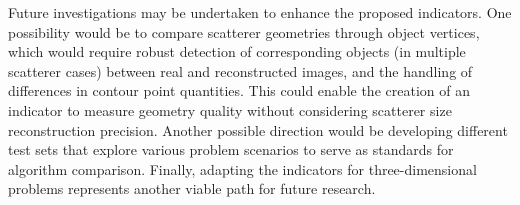 \documentclass{IEEEtran}
\begin{document}
    
        Future investigations may be undertaken to enhance the proposed indicators. One possibility would be to compare scatterer geometries through object vertices, which would require robust detection of corresponding objects (in multiple scatterer cases) between real and reconstructed images, and the handling of differences in contour point quantities. This could enable the creation of an indicator to measure geometry quality without considering scatterer size reconstruction precision. Another possible direction would be developing different test sets that explore various problem scenarios to serve as standards for algorithm comparison. Finally, adapting the indicators for three-dimensional problems represents another viable path for future research.

    \appendices
    
    


    
    
    
    
\end{document}
